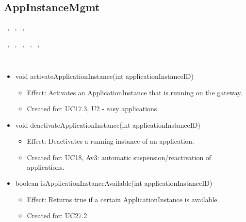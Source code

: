   \subsection{AppInstanceMgmt}\label{int:OnlineServiceOnlineServiceApplicationManagerApplicationContainerAppInstanceMgmt}
    \begin{description}
      \item[Provided by:] \iconcomponent{}~, \iconcomponent{}~, \iconcomponent{}~, \iconcomponent{}~
      \item[Required by:] \iconcomponent{}~, \iconcomponent{}~, \iconcomponent{}~, \iconcomponent{}~, \iconcomponent{}~, \iconcomponent{}~
      \item[Operations:] ~
    \begin{itemize}[noitemsep,nolistsep,leftmargin=-.25cm]
      \item \textsf{void activateApplicationInstance(int applicationInstanceID)}
        \begin{itemize}[noitemsep,nolistsep]
           \item Effect: Activates an ApplicationInstance that is running on the gateway.
\item Created for: UC17.3, U2 - easy applications
        \end{itemize}
      \item \textsf{void deactivateApplicationInstance(int applicationInstanceID)}
        \begin{itemize}[noitemsep,nolistsep]
           \item Effect: Deactivates a running instance of an application.
\item Created for: UC18, Av3: automatic suspension/reactivation of applications.
        \end{itemize}
      \item \textsf{boolean isApplicationInstanceAvailable(int applicationInstanceID)}
        \begin{itemize}[noitemsep,nolistsep]
           \item Effect: Returns true if a certain ApplicationInstance is available.
\item Created for: UC27.2
        \end{itemize}
    \end{itemize}
    \end{description}

